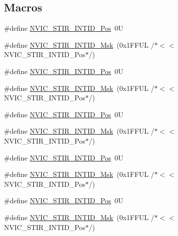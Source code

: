 \subsection*{Macros}
\begin{DoxyCompactItemize}
\item 
\#define \hyperlink{group___c_m_s_i_s___n_v_i_c_ga9eebe495e2e48d302211108837a2b3e8}{N\+V\+I\+C\+\_\+\+S\+T\+I\+R\+\_\+\+I\+N\+T\+I\+D\+\_\+\+Pos}~0U
\item 
\#define \hyperlink{group___c_m_s_i_s___n_v_i_c_gae4060c4dfcebb08871ca4244176ce752}{N\+V\+I\+C\+\_\+\+S\+T\+I\+R\+\_\+\+I\+N\+T\+I\+D\+\_\+\+Msk}~(0x1\+F\+F\+U\+L /$\ast$$<$$<$ N\+V\+I\+C\+\_\+\+S\+T\+I\+R\+\_\+\+I\+N\+T\+I\+D\+\_\+\+Pos$\ast$/)
\item 
\#define \hyperlink{group___c_m_s_i_s___n_v_i_c_ga9eebe495e2e48d302211108837a2b3e8}{N\+V\+I\+C\+\_\+\+S\+T\+I\+R\+\_\+\+I\+N\+T\+I\+D\+\_\+\+Pos}~0U
\item 
\#define \hyperlink{group___c_m_s_i_s___n_v_i_c_gae4060c4dfcebb08871ca4244176ce752}{N\+V\+I\+C\+\_\+\+S\+T\+I\+R\+\_\+\+I\+N\+T\+I\+D\+\_\+\+Msk}~(0x1\+F\+F\+U\+L /$\ast$$<$$<$ N\+V\+I\+C\+\_\+\+S\+T\+I\+R\+\_\+\+I\+N\+T\+I\+D\+\_\+\+Pos$\ast$/)
\item 
\#define \hyperlink{group___c_m_s_i_s___n_v_i_c_ga9eebe495e2e48d302211108837a2b3e8}{N\+V\+I\+C\+\_\+\+S\+T\+I\+R\+\_\+\+I\+N\+T\+I\+D\+\_\+\+Pos}~0U
\item 
\#define \hyperlink{group___c_m_s_i_s___n_v_i_c_gae4060c4dfcebb08871ca4244176ce752}{N\+V\+I\+C\+\_\+\+S\+T\+I\+R\+\_\+\+I\+N\+T\+I\+D\+\_\+\+Msk}~(0x1\+F\+F\+U\+L /$\ast$$<$$<$ N\+V\+I\+C\+\_\+\+S\+T\+I\+R\+\_\+\+I\+N\+T\+I\+D\+\_\+\+Pos$\ast$/)
\item 
\#define \hyperlink{group___c_m_s_i_s___n_v_i_c_ga9eebe495e2e48d302211108837a2b3e8}{N\+V\+I\+C\+\_\+\+S\+T\+I\+R\+\_\+\+I\+N\+T\+I\+D\+\_\+\+Pos}~0U
\item 
\#define \hyperlink{group___c_m_s_i_s___n_v_i_c_gae4060c4dfcebb08871ca4244176ce752}{N\+V\+I\+C\+\_\+\+S\+T\+I\+R\+\_\+\+I\+N\+T\+I\+D\+\_\+\+Msk}~(0x1\+F\+F\+U\+L /$\ast$$<$$<$ N\+V\+I\+C\+\_\+\+S\+T\+I\+R\+\_\+\+I\+N\+T\+I\+D\+\_\+\+Pos$\ast$/)
\item 
\#define \hyperlink{group___c_m_s_i_s___n_v_i_c_ga9eebe495e2e48d302211108837a2b3e8}{N\+V\+I\+C\+\_\+\+S\+T\+I\+R\+\_\+\+I\+N\+T\+I\+D\+\_\+\+Pos}~0U
\item 
\#define \hyperlink{group___c_m_s_i_s___n_v_i_c_gae4060c4dfcebb08871ca4244176ce752}{N\+V\+I\+C\+\_\+\+S\+T\+I\+R\+\_\+\+I\+N\+T\+I\+D\+\_\+\+Msk}~(0x1\+F\+F\+U\+L /$\ast$$<$$<$ N\+V\+I\+C\+\_\+\+S\+T\+I\+R\+\_\+\+I\+N\+T\+I\+D\+\_\+\+Pos$\ast$/)

\end{DoxyCompactItemize}
